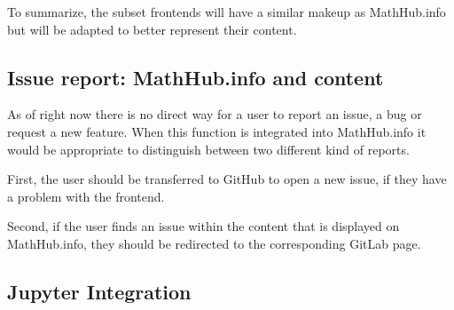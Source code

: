 \documentclass[11pt,a4paper]{article}
\begin{document}
To summarize, the subset frontends will have a similar makeup as MathHub.info but will be adapted to better represent their content.

\subsection{Issue report: MathHub.info and content}
As of right now there is no direct way for a user to report an issue, a bug or request a new feature.
When this function is integrated into MathHub.info it would be appropriate to distinguish between two different kind of reports.

First, the user should be transferred to GitHub to open a new issue, if they have a problem with the frontend.

Second, if the user finds an issue within the content that is displayed on MathHub.info, they should be redirected to the corresponding GitLab page. 
\subsection{Jupyter Integration}
\newpage
\printbibliography
{}
\end{document}
